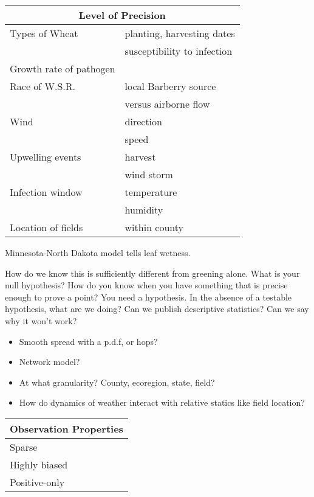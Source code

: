 \documentclass{article}
\newcommand{\wsr}{W.S.R.}
\begin{document}
\begin{tabular}{|l|l|}
\hline
\multicolumn{2}{|c|}{Level of Precision} \\ \hline
Types of Wheat & planting, harvesting dates \\
               & susceptibility to infection \\
\hline
Growth rate of pathogen & \\ \hline
Race of \wsr & local Barberry source \\
             & versus airborne flow \\ \hline
Wind & direction \\
     & speed \\ \hline
Upwelling events & harvest \\
                 & wind storm \\ \hline
Infection window & temperature \\
                 & humidity \\ \hline
Location of fields & within county \\
\hline
\end{tabular}

Minnesota-North Dakota model tells leaf wetness.

How do we know this is sufficiently different from greening alone.
What is your null hypothesis? How do you know when you have something that is precise enough to prove a point? You need a hypothesis. In the absence of a testable hypothesis, what are we doing? Can we publish descriptive statistics? Can we say why it won't work?



\begin{itemize}
\item Smooth spread with a p.d.f, or hops?
\item Network model?
\item At what granularity? County, ecoregion, state, field?
\item How do dynamics of weather interact with relative statics like field location?
\end{itemize}

\noindent\begin{tabular}{|l|}
\hline
Observation Properties \\ \hline
Sparse \\
Highly biased \\
Positive-only \\
\hline
\end{tabular}
\end{document}
